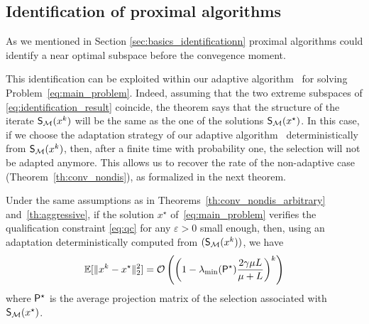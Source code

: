 


\subsection{Identification of proximal algorithms}\label{sec:identif}
{As we mentioned in Section \ref{sec:basics_identificationn} proximal algorithms could identify a near optimal subspace before the convegence moment.}

This identification can be exploited within our adaptive algorithm \adaalgo~for solving Problem~\eqref{eq:main_problem}. Indeed, assuming that the two extreme subspaces of \eqref{eq:identification_result} coincide, the theorem says that the structure of the iterate $\S(x^k)$ will be the same as the one of the solutions $\S(x^\star)$. In this case, if we choose the adaptation strategy of our adaptive algorithm \adaalgo~deterministically from $\S(x^k)$, then, after a finite time with probability one,  the selection will not be adapted anymore. This allows us to recover the rate of the non-adaptive case (Theorem~\ref{th:conv_nondis}), as formalized in the next theorem.


\begin{theorem}\label{th:rate_identif}
Under the same assumptions as in Theorems~\ref{th:conv_nondis_arbitrary} and~\ref{th:aggressive}, if the solution $x^\star$ of~\eqref{eq:main_problem} verifies the qualification constraint \eqref{eq:qc}
for any $\varepsilon>0$ small enough, then, using an adaptation deterministically computed from $(\S(x^k))$, we have \begin{align*}
     \EE[\|x^k-x^\star\|_2^2] = \mathcal{O}\left( \left( 1- \lambda_{\min} (\bP^\star) \frac{2\gamma \mu L}{\mu + L}  \right)^k \right)
 \end{align*}
 where $ \bP^\star$ is the average projection matrix of the selection 
 associated with $\S(x^\star)$.
\end{theorem}

